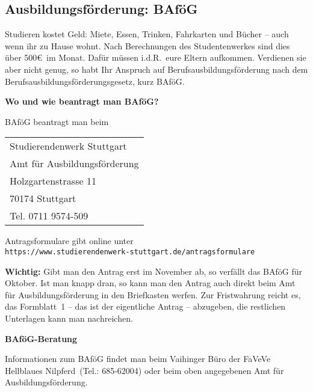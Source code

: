 \subsection{Ausbildungsförderung: BAföG}

Studieren kostet Geld: Miete, Essen, Trinken, Fahrkarten und Bücher --
auch wenn ihr zu Hause wohnt.
Nach Berechnungen des Studentenwerkes sind dies über 500\euro\ im Monat.
Dafür müssen i.d.R.\ eure Eltern aufkommen.
Verdienen sie aber nicht genug,
so habt Ihr Anspruch auf Berufsausbildungsförderung
nach dem Berufsausbildungsförderungsgesetz, kurz BAföG.

{\large \bf Wo und wie beantragt man BAföG?}

BAföG beantragt man beim

\begin{center}\begin{tabular}{|ll|}\hline
\multicolumn{2}{|l|}{Studierendenwerk Stuttgart}\\
\multicolumn{2}{|l|}{Amt für Ausbildungsförderung}\\
Holzgartenstrasse 11   & \\
70174 Stuttgart  & \\
\multicolumn{2}{|l|}{Tel. 0711 9574-509}\\\hline
\end{tabular}\end{center}

Antragsformulare gibt online unter\\
 \verb|https://www.studierendenwerk-stuttgart.de/antragsformulare| 

{\bf Wichtig:}
Gibt man den Antrag erst im November ab,
so verfällt das BAföG für Oktober.
Ist man knapp dran, so kann man den Antrag auch direkt
beim Amt für Ausbildungsförderung in den Briefkasten werfen.
Zur Fristwahrung reicht es, das Formblatt~1 --
das ist der eigentliche Antrag -- abzugeben,
die restlichen Unterlagen kann man nachreichen.


\newpage
{\large \bf BAföG-Beratung}

Informationen zum BAföG findet man beim Vaihinger Büro der FaVeVe
\glqq Hellblaues Nilpferd\grqq~(Tel.: 685-62004)
oder beim oben angegebenen Amt für Ausbildungsförderung.

